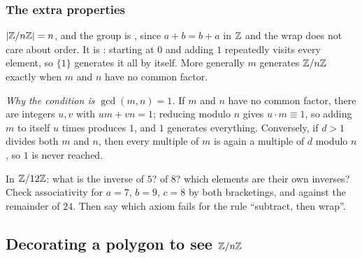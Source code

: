 \subsubsection*{The extra properties}

$|\mathbb{Z}/n\mathbb{Z}|=n$, and the group is , since $a+b=b+a$ in $\mathbb{Z}$ and the wrap does not care
about order. It is : starting at $0$ and adding $1$ repeatedly visits every element, so
$\{1\}$ generates it all by itself. More generally $m$ generates $\mathbb{Z}/n\mathbb{Z}$ exactly when $m$ and $n$
have no common factor.

\begin{why}
\emph{Why the condition is $\gcd(m,n)=1$.} If $m$ and $n$ have no common factor, there are integers
$u,v$ with $um+vn=1$; reducing modulo $n$ gives $u\cdot m\equiv 1$, so adding $m$ to itself $u$
times produces $1$, and $1$ generates everything. Conversely, if $d>1$ divides both $m$ and $n$,
then every multiple of $m$ is again a multiple of $d$ modulo $n$, so $1$ is never reached.
\end{why}



\begin{tryit}
In $\mathbb{Z}/12\mathbb{Z}$: what is the inverse of $5$? of $8$? which elements are their own inverses? Check
associativity for $a=7$, $b=9$, $c=8$ by both bracketings, and against the remainder of $24$. Then
say which axiom fails for the rule ``subtract, then wrap''.
\end{tryit}

\subsection{Decorating a polygon to see $\mathbb{Z}/n\mathbb{Z}$}\label{sec:arrowgon}

